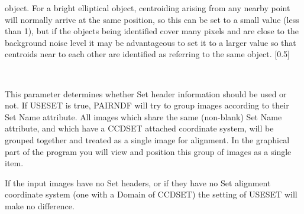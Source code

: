 \documentclass[twoside,11pt]{article}
\renewcommand{\_}{\texttt{\symbol{95}}}
\newcommand{\routine}[1]{{\sc #1}}
\newcommand{\sstsubsection}[1]{ \item[{#1}] \mbox{} \\}
\newcommand{\sstsubsection}[1]{\item[{#1}]}
\begin{document}
{{{         object.  For a bright elliptical object, centroiding arising 
         from any nearby point will normally arrive at the same 
         position, so this can be set to a small value (less than 1), but 
         if the objects being identified cover many pixels and are close
         to the background noise level it may be advantageous to set
         it to a larger value so that centroids near to each other
         are identified as referring to the same object.
         [0.5]
      }
      \sstsubsection{
         USESET = \_LOGICAL (Read)
      }{
         This parameter determines whether Set header information should
         be used or not.  If USESET is true,
         \routine{PAIRNDF} will try to group images according to their Set Name
         attribute.  All images which share the same (non-blank) Set
         Name attribute, and which have a CCD\_SET attached coordinate
         system, will be grouped together and treated as a single
         image for alignment.  In the graphical part of the program you
         will view and position this group of images as a single item.

         If the input images have no Set headers, or if they have no
         Set alignment coordinate system (one with a Domain of CCD\_SET)
         the setting of USESET will make no difference.

}}}
\end{document}
